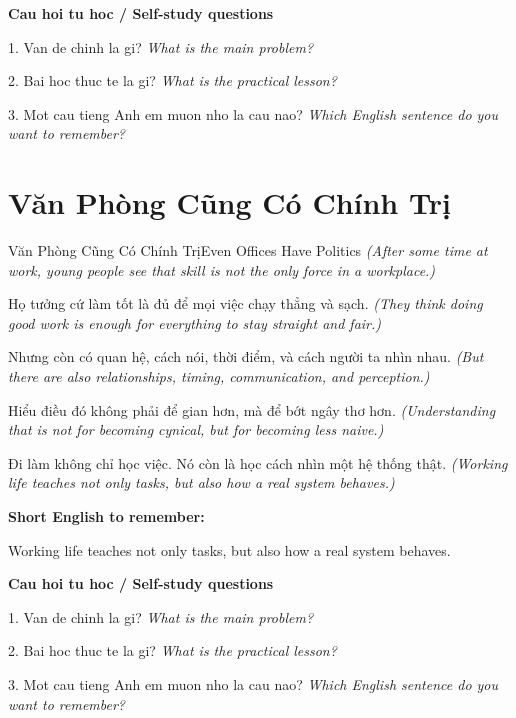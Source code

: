 \begin{tuhocnhanh}
\textbf{Cau hoi tu hoc / Self-study questions}

1. Van de chinh la gi? \textit{What is the main problem?}

2. Bai hoc thuc te la gi? \textit{What is the practical lesson?}

3. Mot cau tieng Anh em muon nho la cau nao? \textit{Which English sentence do you want to remember?}
\end{tuhocnhanh}
\ngancach

\section{Văn Phòng Cũng Có Chính Trị}
\begin{truyen}{Văn Phòng Cũng Có Chính Trị}{Even Offices Have Politics}
\textit{(After some time at work, young people see that skill is not the only force in a workplace.)}

Họ tưởng cứ làm tốt là đủ để mọi việc chạy thẳng và sạch.
\textit{(They think doing good work is enough for everything to stay straight and fair.)}

Nhưng còn có quan hệ, cách nói, thời điểm, và cách người ta nhìn nhau.
\textit{(But there are also relationships, timing, communication, and perception.)}

Hiểu điều đó không phải để gian hơn, mà để bớt ngây thơ hơn.
\textit{(Understanding that is not for becoming cynical, but for becoming less naive.)}

\end{truyen}

\begin{baihoc}
Đi làm không chỉ học việc. Nó còn là học cách nhìn một hệ thống thật.
\textit{(Working life teaches not only tasks, but also how a real system behaves.)}
\end{baihoc}

\begin{ghinhoanh}
\textbf{Short English to remember:}

Working life teaches not only tasks, but also how a real system behaves.

\end{ghinhoanh}

\begin{tuhocnhanh}
\textbf{Cau hoi tu hoc / Self-study questions}

1. Van de chinh la gi? \textit{What is the main problem?}

2. Bai hoc thuc te la gi? \textit{What is the practical lesson?}

3. Mot cau tieng Anh em muon nho la cau nao? \textit{Which English sentence do you want to remember?}
\end{tuhocnhanh}
\ngancach

